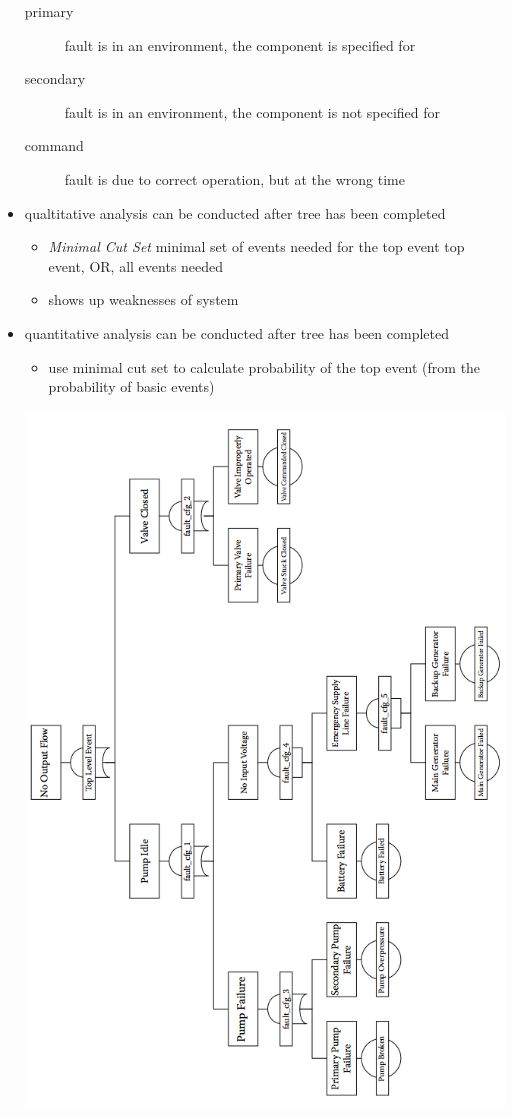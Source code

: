 \documentclass[a4paper, 10pt]{article}
\begin{document}
\begin{itemize}
    \begin{description}
        \item[primary] fault is in an environment, the component is specified for
        \item[secondary] fault is in an environment, the component is not specified for
        \item[command] fault is due to correct operation, but at the wrong time
    \end{description}
    \item qualtitative analysis can be conducted after tree has been completed
    \begin{itemize}
        \item \emph{Minimal Cut Set} minimal set of events needed for the top event \follows top event, OR, all events needed
        \item shows up weaknesses of system
    \end{itemize}
    \item quantitative analysis can be conducted after tree has been completed
    \begin{itemize}
        \item use minimal cut set to calculate probability of the top event (from the probability of basic events)
    \end{itemize}
    \begin{center}
    \includegraphics[width=\linewidth]{images/FTex.png}

\end{center}
\end{itemize}
\end{document}
